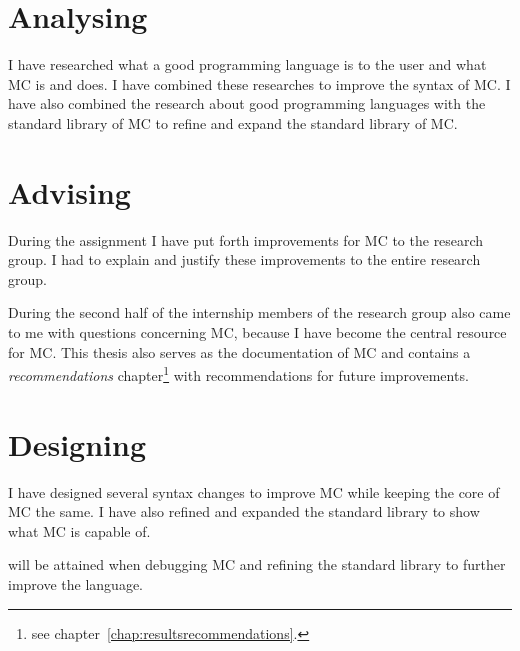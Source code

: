 \section{Analysing}
I have researched what a good programming language is to the user and what MC is and does.
I have combined these researches to improve the syntax of MC.
I have also combined the research about good programming languages with the standard library of MC to refine and expand the standard library of MC.



\section{Advising}
During the assignment I have put forth improvements for MC to the research group.
I had to explain and justify these improvements to the entire research group.

During the second half of the internship members of the research group also came to me with questions concerning MC, because I have become the central resource for MC.
This thesis also serves as the documentation of MC and contains a \emph{recommendations} chapter\footnote{see chapter~\ref{chap:resultsrecommendations}.} with recommendations for future improvements.



\section{Designing}
I have designed several syntax changes to improve MC while keeping the core of MC the same.
I have also refined and expanded the standard library to show what MC is capable of.

will be attained when debugging MC and refining the standard library to further improve the language.


